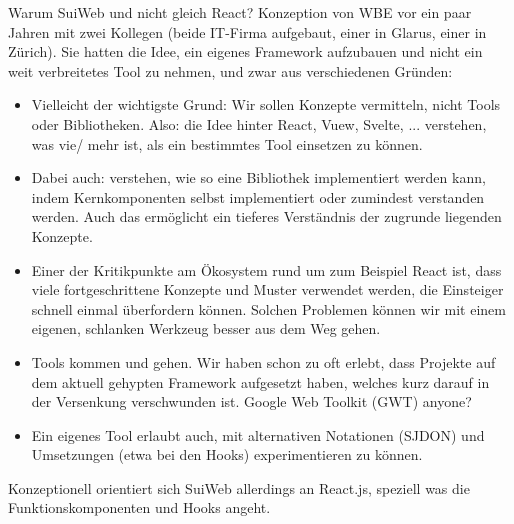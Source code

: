 \begin{example2}{Warum SuiWeb und nicht gleich React?}
    Konzeption von WBE vor ein paar Jahren mit zwei Kollegen (beide IT-Firma aufgebaut, einer in Glarus, einer in Zürich). Sie hatten die Idee, ein eigenes Framework aufzubauen und nicht ein weit verbreitetes Tool zu nehmen, und zwar aus verschiedenen Gründen:
    \begin{itemize}
        \item Vielleicht der wichtigste Grund: Wir sollen Konzepte vermitteln, nicht Tools oder Bibliotheken. Also: die Idee hinter React, Vuew, Svelte, ... verstehen, was vie/ mehr ist, als ein bestimmtes Tool einsetzen zu können.
        \item Dabei auch: verstehen, wie so eine Bibliothek implementiert werden kann, indem Kernkomponenten selbst implementiert oder zumindest verstanden werden. Auch das ermöglicht ein tieferes Verständnis der zugrunde liegenden Konzepte.
        \item Einer der Kritikpunkte am Ökosystem rund um zum Beispiel React ist, dass viele fortgeschrittene Konzepte und Muster verwendet werden, die Einsteiger schnell einmal überfordern können. Solchen Problemen können wir mit einem eigenen, schlanken Werkzeug besser aus dem Weg gehen.
        \item Tools kommen und gehen. Wir haben schon zu oft erlebt, dass Projekte auf dem aktuell gehypten Framework aufgesetzt haben, welches kurz darauf in der Versenkung verschwunden ist. Google Web Toolkit (GWT) anyone?
        \item Ein eigenes Tool erlaubt auch, mit alternativen Notationen (SJDON) und Umsetzungen (etwa bei den Hooks) experimentieren zu können.
    \end{itemize}    
    Konzeptionell orientiert sich SuiWeb allerdings an React.js, speziell was die Funktionskomponenten und Hooks angeht.
\end{example2}

